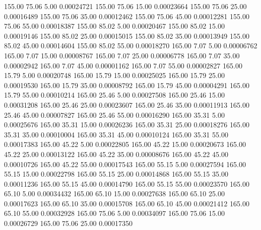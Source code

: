     155.00     75.06      5.00     0.00024721
    155.00     75.06     15.00     0.00023664
    155.00     75.06     25.00     0.00016489
    155.00     75.06     35.00     0.00012462
    155.00     75.06     45.00     0.00012281
    155.00     75.06     55.00     0.00018387
    155.00     85.02      5.00     0.00020467
    155.00     85.02     15.00     0.00019146
    155.00     85.02     25.00     0.00015015
    155.00     85.02     35.00     0.00013949
    155.00     85.02     45.00     0.00014604
    155.00     85.02     55.00     0.00018270
    165.00      7.07      5.00     0.00006762
    165.00      7.07     15.00     0.00008767
    165.00      7.07     25.00     0.00006778
    165.00      7.07     35.00     0.00002942
    165.00      7.07     45.00     0.00001162
    165.00      7.07     55.00     0.00002827
    165.00     15.79      5.00     0.00020748
    165.00     15.79     15.00     0.00025025
    165.00     15.79     25.00     0.00019530
    165.00     15.79     35.00     0.00008792
    165.00     15.79     45.00     0.00004291
    165.00     15.79     55.00     0.00010214
    165.00     25.46      5.00     0.00027508
    165.00     25.46     15.00     0.00031208
    165.00     25.46     25.00     0.00023607
    165.00     25.46     35.00     0.00011913
    165.00     25.46     45.00     0.00007827
    165.00     25.46     55.00     0.00016290
    165.00     35.31      5.00     0.00025676
    165.00     35.31     15.00     0.00026236
    165.00     35.31     25.00     0.00018276
    165.00     35.31     35.00     0.00010004
    165.00     35.31     45.00     0.00010124
    165.00     35.31     55.00     0.00017383
    165.00     45.22      5.00     0.00022805
    165.00     45.22     15.00     0.00020673
    165.00     45.22     25.00     0.00013122
    165.00     45.22     35.00     0.00008676
    165.00     45.22     45.00     0.00010726
    165.00     45.22     55.00     0.00017543
    165.00     55.15      5.00     0.00027594
    165.00     55.15     15.00     0.00022798
    165.00     55.15     25.00     0.00014868
    165.00     55.15     35.00     0.00011236
    165.00     55.15     45.00     0.00014790
    165.00     55.15     55.00     0.00023570
    165.00     65.10      5.00     0.00034432
    165.00     65.10     15.00     0.00027638
    165.00     65.10     25.00     0.00017623
    165.00     65.10     35.00     0.00015708
    165.00     65.10     45.00     0.00021412
    165.00     65.10     55.00     0.00032928
    165.00     75.06      5.00     0.00034097
    165.00     75.06     15.00     0.00026729
    165.00     75.06     25.00     0.00017350
